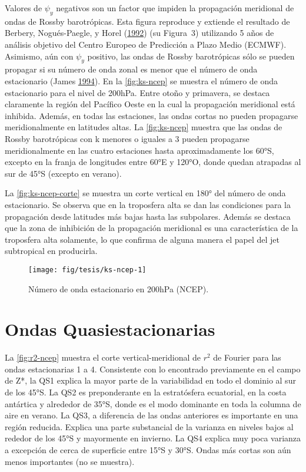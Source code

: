 \documentclass[spanish,a4paper,12p]{book}
\begin{document}
Valores de \(\psi_y\) negativos son un factor que impiden la propagación
meridional de ondas de Rossby barotrópicas. Esta figura reproduce y
extiende el resultado de Berbery, Nogués-Paegle, y Horel
(\protect\hyperlink{ref-Berbery1992}{1992}) (su Figura~3) utilizando 5
años de análisis objetivo del Centro Europeo de Predicción a Plazo Medio
(ECMWF). Asimismo, aún con \(\psi_y\) positivo, las ondas de Rossby
barotrópicas sólo se pueden propagar si su número de onda zonal es menor
que el número de onda estacionario (James
\protect\hyperlink{ref-James}{1994}). En la \autoref{fig:ks-ncep} se
muestra el número de onda estacionario para el nivel de 200hPa. Entre
otoño y primavera, se destaca claramente la región del Pacífico Oeste en
la cual la propagación meridional está inhibida. Además, en todas las
estaciones, las ondas cortas no pueden propagarse meridionalmente en
latitudes altas. La \autoref{fig:ks-ncep} muestra que las ondas de
Rossby barotrópicas con k menores o iguales a 3 pueden propagarse
meridionalmente en las cuatro estaciones hasta aproximadamente los 60°S,
excepto en la franja de longitudes entre 60°E y 120°O, donde quedan
atrapadas al sur de 45°S (excepto en verano).

La \autoref{fig:ks-ncep-corte} se muestra un corte vertical en 180° del
número de onda estacionario. Se observa que en la troposfera alta se dan
las condiciones para la propagación desde latitudes más bajas hasta las
subpolares. Además se destaca que la zona de inhibición de la
propagación meridional es una característica de la troposfera alta
solamente, lo que confirma de alguna manera el papel del jet subtropical
en producirla.

\begin{landscape}\begin{figure}

{\centering \texttt{[image: fig/tesis/ks-ncep-1]} 

}

\caption{Número de onda estacionario en 200hPa (NCEP).}\label{fig:ks-ncep}
\end{figure}
\end{landscape}

\section{Ondas Quasiestacionarias}\label{ondas-quasiestacionarias}

La \autoref{fig:r2-ncep} muestra el corte vertical-meridional de \(r^2\)
de Fourier para las ondas estacionarias 1 a 4. Consistente con lo
encontrado previamente en el campo de Z*, la QS1 explica la mayor parte
de la variabilidad en todo el dominio al sur de los 45°S. La QS2 es
preponderante en la estratósfera ecuatorial, en la costa antártica y
alrededor de 35°S, donde es el modo dominante en toda la columna de aire
en verano. La QS3, a diferencia de las ondas anteriores es importante en
una región reducida. Explica una parte substancial de la varianza en
niveles bajos al rededor de los 45°S y mayormente en invierno. La QS4
explica muy poca varianza a excepción de cerca de superficie entre 15°S
y 30°S. Ondas más cortas son aún menos importantes (no se muestra).
\end{document}

